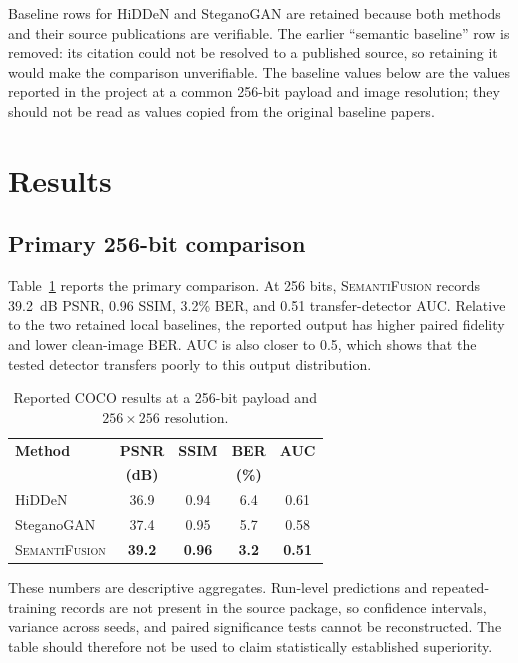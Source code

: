 \documentclass[pdflatex,sn-mathphys-num]{sn-jnl}
\newcommand{\method}{\textsc{SemantiFusion}}
\begin{document}
Baseline rows for HiDDeN and SteganoGAN are retained because both methods and their source publications are verifiable. The earlier ``semantic baseline'' row is removed: its citation could not be resolved to a published source, so retaining it would make the comparison unverifiable. The baseline values below are the values reported in the project at a common 256-bit payload and image resolution; they should not be read as values copied from the original baseline papers.

\section{Results}
\label{sec:results}

\subsection{Primary 256-bit comparison}

Table~\ref{tab:primary} reports the primary comparison. At 256 bits, \method{} records 39.2~dB PSNR, 0.96 SSIM, 3.2\% BER, and 0.51 transfer-detector AUC. Relative to the two retained local baselines, the reported output has higher paired fidelity and lower clean-image BER. AUC is also closer to 0.5, which shows that the tested detector transfers poorly to this output distribution.

\begin{table}[t]
\centering
\caption{Reported COCO results at a 256-bit payload and $256\times256$ resolution.}
\label{tab:primary}
\begin{tabular}{lcccc}
\toprule
\textbf{Method} & \textbf{PSNR} & \textbf{SSIM} & \textbf{BER} & \textbf{AUC} \\
& \textbf{(dB)} & & \textbf{(\%)} & \\
\midrule
HiDDeN \cite{zhu2018hidden} & 36.9 & 0.94 & 6.4 & 0.61 \\
SteganoGAN \cite{zhang2019steganogan} & 37.4 & 0.95 & 5.7 & 0.58 \\
\method{} & \textbf{39.2} & \textbf{0.96} & \textbf{3.2} & \textbf{0.51} \\
\bottomrule
\end{tabular}
\end{table}

These numbers are descriptive aggregates. Run-level predictions and repeated-training records are not present in the source package, so confidence intervals, variance across seeds, and paired significance tests cannot be reconstructed. The table should therefore not be used to claim statistically established superiority.
\end{document}
